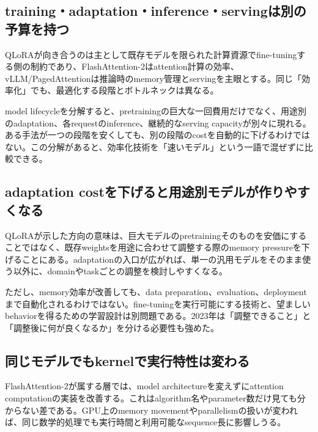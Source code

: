 
\subsection{training・adaptation・inference・servingは別の予算を持つ}

QLoRAが向き合うのは主として既存モデルを限られた計算資源でfine-tuningする側の制約であり、FlashAttention-2はattention計算の効率、vLLM/PagedAttentionは推論時のmemory管理とservingを主眼とする。同じ「効率化」でも、最適化する段階とボトルネックは異なる。\autocite{src-1ab9d44a819a,src-5e1a3a4fc45b,src-7f830e688335,src-e03b0ba5b24e,src-fb804ac849e4}


model lifecycleを分解すると、pretrainingの巨大な一回費用だけでなく、用途別のadaptation、各requestのinference、継続的なserving capacityが別々に現れる。ある手法が一つの段階を安くしても、別の段階のcostを自動的に下げるわけではない。この分解があると、効率化技術を「速いモデル」という一語で混ぜずに比較できる。\autocite{src-1ab9d44a819a,src-5e1a3a4fc45b,src-7f830e688335,src-e03b0ba5b24e,src-fb804ac849e4}


\subsection{adaptation costを下げると用途別モデルが作りやすくなる}

QLoRAが示した方向の意味は、巨大モデルのpretrainingそのものを安価にすることではなく、既存weightsを用途に合わせて調整する際のmemory pressureを下げることにある。adaptationの入口が広がれば、単一の汎用モデルをそのまま使う以外に、domainやtaskごとの調整を検討しやすくなる。\autocite{src-7f830e688335}


ただし、memory効率が改善しても、data preparation、evaluation、deploymentまで自動化されるわけではない。fine-tuningを実行可能にする技術と、望ましいbehaviorを得るための学習設計は別問題である。2023年は「調整できること」と「調整後に何が良くなるか」を分ける必要性も強めた。\autocite{src-7f830e688335}


\subsection{同じモデルでもkernelで実行特性は変わる}

FlashAttention-2が属する層では、model architectureを変えずにattention computationの実装を改善する。これはalgorithm名やparameter数だけ見ても分からない差である。GPU上のmemory movementやparallelismの扱いが変われば、同じ数学的処理でも実行時間と利用可能なsequence長に影響しうる。\autocite{src-5e1a3a4fc45b}


